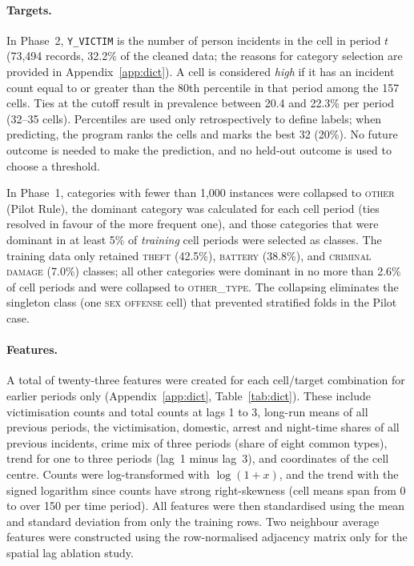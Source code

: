\documentclass[11pt,a4paper]{report}
\begin{document}
\paragraph{Targets.} In Phase~2, \texttt{Y\_VICTIM} is the number of person incidents in the cell in period $t$ (73,494 records, 32.2\% of the cleaned data; the reasons for category selection are provided in Appendix~\ref{app:dict}). A cell is considered \emph{high} if it has an incident count equal to or greater than the 80th percentile in that period among the 157 cells. Ties at the cutoff result in prevalence between 20.4 and 22.3\% per period (32--35 cells). Percentiles are used only retrospectively to define labels; when predicting, the program ranks the cells and marks the best 32 (20\%). No future outcome is needed to make the prediction, and no held-out outcome is used to choose a threshold.

In Phase~1, categories with fewer than 1,000 instances were collapsed to \textsc{other} (Pilot Rule), the dominant category was calculated for each cell period (ties resolved in favour of the more frequent one), and those categories that were dominant in at least 5\% of \emph{training} cell periods were selected as classes. The training data only retained \textsc{theft} (42.5\%), \textsc{battery} (38.8\%), and \textsc{criminal damage} (7.0\%) classes; all other categories were dominant in no more than 2.6\% of cell periods and were collapsed to \textsc{other\_type}. The collapsing eliminates the singleton class (one \textsc{sex offense} cell) that prevented stratified folds in the Pilot case.

\paragraph{Features.} A total of twenty-three features were created for each cell/target combination for earlier periods only (Appendix~\ref{app:dict}, Table~\ref{tab:dict}). These include victimisation counts and total counts at lags 1 to 3, long-run means of all previous periods, the victimisation, domestic, arrest and night-time shares of all previous incidents, crime mix of three periods (share of eight common types), trend for one to three periods (lag~1 minus lag~3), and coordinates of the cell centre. Counts were log-transformed with $\log(1+x)$, and the trend with the signed logarithm since counts have strong right-skewness (cell means span from 0 to over 150 per time period). All features were then standardised using the mean and standard deviation from only the training rows. Two neighbour average features were constructed using the row-normalised adjacency matrix only for the spatial lag ablation study.
\end{document}
